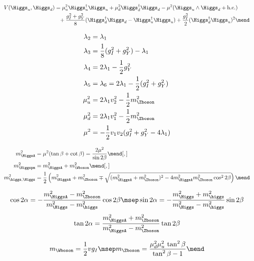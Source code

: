 \begin{align}
V(\Higgs_u,\Higgs_d)
&
=
\mu_u^2\Higgs_u^\dagger\Higgs_u
+
\mu_d^2\Higgs_d^\dagger\Higgs_d
-
\mu^2 (\Higgs_u\wedge\Higgs_d+\text{h.c.})
\\
&\hphantom{=}
+
\frac{g_I^2+g_Y^2}{8} (\Higgs_d^\dagger\Higgs_d-\Higgs_u^\dagger\Higgs_u)
+
\frac{g_I^2}{2} (\Higgs_d^\dagger\Higgs_u)^2
\mend
\end{align}

\begin{subequations}
\begin{align}
\lambda_2 &= \lambda_1\\
\lambda_3 &= \frac{1}{8} (g_I^2+g_Y^2)-\lambda_1\\
\lambda_4 &= 2\lambda_1 - \frac{1}{2} g_Y^2\\
\lambda_5 &= \lambda_6 = 2\lambda_1 - \frac{1}{2}(g_I^2+g_Y^2)\\
\mu_u^2 &= 2 \lambda_1 v_2^2 - \frac{1}{2} m_{\Zboson}^2\\
\mu_d^2 &= 2 \lambda_1 v_1^2 - \frac{1}{2} m_{\Zboson}^2\\
\mu^2 &= -\frac{1}{2}v_1v_2(g_I^2+g_Y^2-4\lambda_1)
\end{align}
\end{subequations}


\begin{align}
m_{\HiggsA}^2 &= \mu^2 (\tan\beta+\cot\beta) = \frac{2\mu^2}{\sin 2\beta}
\mend[,]\\
m_{\Higgspm}^2 &= m_{\HiggsA}^2+m_{\Wboson}^2
\mend[,]\\
m_{\higgs,\Higgs}^2 &= \frac{1}{2} \left( m_{\HiggsA}^2+m_{\Zboson}^2 \mp \sqrt{(m_{\HiggsA}^2+m_{\Zboson}^2)^2-4m_{\HiggsA}^2m_{\Zboson}^2\cos^2 2\beta} \right)
\mend
\end{align}

\begin{equation}
\cos 2\alpha = - \frac{m_{\HiggsA}^2-m_{\Zboson}^2}{m_{\Higgs}^2-m_{\higgs}^2} \cos 2\beta
\msep
\sin 2\alpha = - \frac{m_{\Higgs}^2+m_{\higgs}^2}{m_{\Higgs}^2-m_{\higgs}^2} \sin 2\beta
\end{equation}
\begin{equation}
\tan 2\alpha = \frac{m_{\HiggsA}^2+m_{\Zboson}^2}{m_{\HiggsA}^2-m_{\Zboson}^2} \tan 2\beta
\end{equation}

\begin{equation}
m_{\Wboson} = \frac{1}{2} v g_I
\msep
m_{\Zboson} = \frac{\mu_d^2\mu_u^2 \, \tan^2\beta}{\tan^2\beta-1}
\mend
\end{equation}


